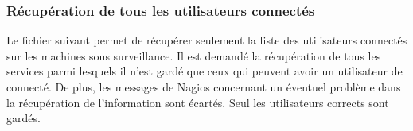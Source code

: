 \begin{appendices}


\subsubsection{R\'ecup\'eration de tous les utilisateurs connect\'es}

Le fichier suivant permet de r\'ecup\'erer seulement la liste des utilisateurs connect\'es sur les machines sous surveillance.
Il est demand\'e la r\'ecup\'eration de tous les services parmi lesquels il n'est gard\'e que ceux qui peuvent avoir un utilisateur de connect\'e.
De plus, les messages de Nagios concernant un \'eventuel probl\`eme dans la r\'ecup\'eration de l'information sont \'ecart\'es.
Seul les utilisateurs \og corrects\fg{} sont gard\'es.

\vspace{0.20cm}




\end{appendices}
